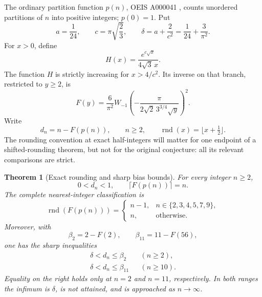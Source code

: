 \documentclass[11pt]{article}
\numberwithin{equation}{section}
\newtheorem{theorem}{Theorem}[section]
\theoremstyle{definition}
\theoremstyle{remark}
\newcommand{\rnd}{\operatorname{rnd}}
\begin{document}
The ordinary partition function $p(n)$, OEIS A000041 \cite{oeis000041}, counts unordered
partitions of $n$ into positive integers; $p(0)=1$. Put
\begin{equation}\label{eq:constants}
 a=\frac1{24},\qquad c=\pi\sqrt{\frac23},\qquad
 \delta=a+\frac2{c^2}=\frac1{24}+\frac3{\pi^2}.
\end{equation}
For $x>0$, define
\begin{equation}\label{eq:H}
 H(x)=\frac{e^{c\sqrt x}}{4\sqrt3\,x}.
\end{equation}
The function $H$ is strictly increasing for $x>4/c^2$. Its inverse on
that branch, restricted to $y\ge2$, is
\begin{equation}\label{eq:F}
 F(y)=\frac6{\pi^2}
 W_{-1}\!\left(-\frac{\pi}{2\sqrt2\,3^{3/4}\sqrt y}\right)^2.
\end{equation}
Write
\begin{equation}\label{eq:bias}
 d_n=n-F(p(n)),\qquad n\ge2,
 \qquad \rnd(x)=\lfloor x+\tfrac12\rfloor.
\end{equation}
The rounding convention at exact half-integers will matter for one
endpoint of a shifted-rounding theorem, but not for the original
conjecture: all its relevant comparisons are strict.

\begin{theorem}[Exact rounding and sharp bias bounds]\label{thm:main}
For every integer $n\ge2$,
\begin{equation}\label{eq:ceiling}
 0<d_n<1,\qquad \lceil F(p(n))\rceil=n.
\end{equation}
The complete nearest-integer classification is
\begin{equation}\label{eq:exceptions}
 \rnd(F(p(n)))=
 \begin{cases}
 n-1,&n\in\{2,3,4,5,7,9\},\\
 n,&\text{otherwise}.
 \end{cases}
\end{equation}
Moreover, with
\begin{equation}\label{eq:betas}
 \beta_2=2-F(2),\qquad \beta_{11}=11-F(56),
\end{equation}
one has the sharp inequalities
\begin{align}
 \delta<d_n\le\beta_2&& (n\ge2),\label{eq:globalextreme}\\
 \delta<d_n\le\beta_{11}&& (n\ge10).\label{eq:tailextreme}
\end{align}
Equality on the right holds only at $n=2$ and $n=11$, respectively.
In both ranges the infimum is $\delta$, is not attained, and is approached
as $n\to\infty$.
\end{theorem}
\end{document}

